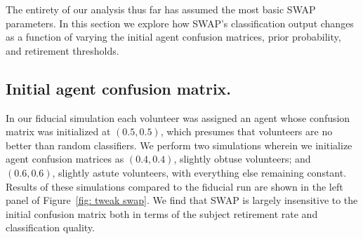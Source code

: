 The entirety of our analysis thus far has assumed the most basic SWAP parameters. In this section we explore how SWAP's classification output changes as a function of varying the initial agent confusion matrices, prior probability, and retirement thresholds.


\subsection{Initial agent confusion matrix.} 
In our fiducial simulation each volunteer was assigned an agent whose confusion matrix was initialized at $(0.5, 0.5)$, which presumes that volunteers are no better than random classifiers. We perform two simulations wherein we initialize agent confusion matrices as $(0.4, 0.4)$, slightly obtuse volunteers; and $(0.6, 0.6)$, slightly astute volunteers, with everything else remaining constant.  Results of these simulations compared to the fiducial run are shown in the left panel of Figure~\ref{fig: tweak swap}. We find that SWAP is largely insensitive to the initial confusion matrix  both in terms of the subject retirement rate and classification quality.  

